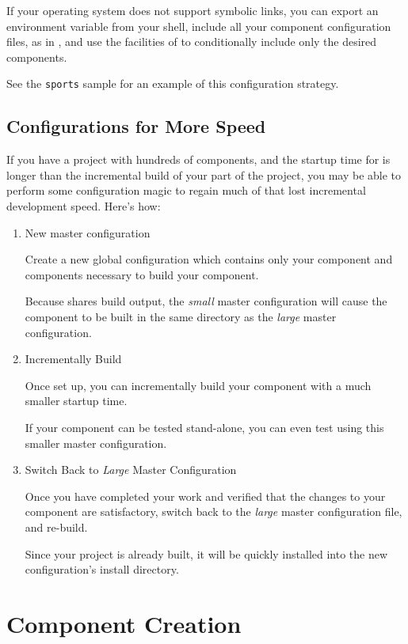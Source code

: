 If your operating system does not support symbolic links, you can
export an environment variable from your shell, include all your
component configuration files, as in , and use
the facilities of \gnumake to conditionally include only the desired
components.

See the \texttt{sports} sample for an example of this configuration
strategy.

\subsection{Configurations for More Speed}

If you have a project with hundreds of components, and the startup
time for \lmsbw is longer than the incremental build of your part of
the project, you may be able to perform some configuration magic to
regain much of that lost incremental development speed.  Here's how:

\begin{enumerate}
\item New master configuration

  Create a new global configuration which contains only your component
  and components necessary to build your component.

  Because \lmsbw shares build output, the \emph{small} master
  configuration will cause the component to be built in the same
  directory as the \emph{large} master configuration.

\item Incrementally Build

  Once set up, you can incrementally build your component with a much
  smaller startup time.

  If your component can be tested stand-alone, you can even test using
  this smaller master configuration.

\item Switch Back to \emph{Large} Master Configuration

  Once you have completed your work and verified that the changes to
  your component are satisfactory, switch back to the \emph{large}
  master configuration file, and re-build.

  Since your project is already built, it will be quickly installed
  into the new configuration's install directory.

\end{enumerate}

\section{Component Creation}\label{wrap:component-creation}

